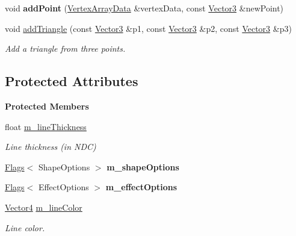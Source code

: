 \begin{Indent}
\begin{DoxyCompactItemize}
\mbox{\label{classrev_1_1_lines_acdba9f164aa139a6e8b051afe8e76235}} 
void {\bfseries add\+Point} (\mbox{\hyperlink{classrev_1_1_vertex_array_data}{Vertex\+Array\+Data}} \&vertex\+Data, const \mbox{\hyperlink{classrev_1_1_vector}{Vector3}} \&new\+Point)
\item 
\mbox{\label{classrev_1_1_lines_a2ed9226cd31b69e31e12713a4e835cfd}} 
void \mbox{\hyperlink{classrev_1_1_lines_a2ed9226cd31b69e31e12713a4e835cfd}{add\+Triangle}} (const \mbox{\hyperlink{classrev_1_1_vector}{Vector3}} \&p1, const \mbox{\hyperlink{classrev_1_1_vector}{Vector3}} \&p2, const \mbox{\hyperlink{classrev_1_1_vector}{Vector3}} \&p3)
\begin{DoxyCompactList}\small\item\em Add a triangle from three points. \end{DoxyCompactList}\end{DoxyCompactItemize}
\end{Indent}
\subsection*{Protected Attributes}
\begin{Indent}\textbf{ Protected Members}\par
\begin{DoxyCompactItemize}
\item 
\mbox{\label{classrev_1_1_lines_aa954e8fb3034c7fc6a80fbcec451652a}} 
float \mbox{\hyperlink{classrev_1_1_lines_aa954e8fb3034c7fc6a80fbcec451652a}{m\+\_\+line\+Thickness}}
\begin{DoxyCompactList}\small\item\em Line thickness (in N\+DC) \end{DoxyCompactList}\item 
\mbox{\label{classrev_1_1_lines_ad9c447364ffcc11deb4f5d990939cd89}} 
\mbox{\hyperlink{classrev_1_1_flags}{Flags}}$<$ Shape\+Options $>$ {\bfseries m\+\_\+shape\+Options}
\item 
\mbox{\label{classrev_1_1_lines_a5cfcb2375c26fb852ef11deb4371bd83}} 
\mbox{\hyperlink{classrev_1_1_flags}{Flags}}$<$ Effect\+Options $>$ {\bfseries m\+\_\+effect\+Options}
\item 
\mbox{\label{classrev_1_1_lines_a82dcbaa05936b2cde99f6ddbec794fc5}} 
\mbox{\hyperlink{classrev_1_1_vector}{Vector4}} \mbox{\hyperlink{classrev_1_1_lines_a82dcbaa05936b2cde99f6ddbec794fc5}{m\+\_\+line\+Color}}
\begin{DoxyCompactList}\small\item\em Line color. \end{DoxyCompactList}\end{DoxyCompactItemize}
\end{Indent}
